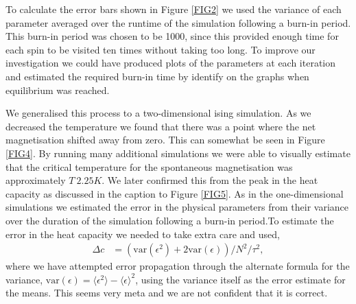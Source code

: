 \documentclass[a4paper]{article}
\begin{document}
\begin{multicols}{2}
        To calculate the error bars shown in Figure \ref{FIG2} we used the %
        variance of each parameter averaged over the runtime of the simulation %
        following a burn-in period. This burn-in period was chosen to be 1000, %
        since this provided enough time for each spin to be visited ten times %
        without taking too long. To improve our investigation we could have %
        produced plots of the parameters at each iteration and estimated the %
        required burn-in time by identify on the graphs when equilibrium was %
        reached. 
    
        We generalised this process to a two-dimensional ising simulation. %
        As we decreased the temperature we found that there was a point %
        where the net magnetisation shifted away from zero. This can somewhat %
        be seen in Figure \ref{FIG4}. By running many additional simulations %
        we were able to visually estimate that the critical temperature for %
        the spontaneous magnetisation was approximately \(T ~ 2.25K\). We %
        later confirmed this from the peak in the heat capacity as discussed %
        in the caption to Figure \ref{FIG5}. As in the one-dimensional %
        simulations we estimated the error in the physical parameters from %
        their variance over the duration of the simulation following a %
        burn-in period.To estimate the error in the heat capacity we needed %
        to take extra care and used,
        \begin{align}
            \Delta c &= \left(\text{var}(\epsilon^{2}) + 
                2\text{var}(\epsilon)\right) / N^{2} / \tau^{2},
        \end{align}
        where we have attempted error propagation through the alternate %
        formula for the variance, \(\text{var}(\epsilon) = 
        \langle\epsilon^{2}\rangle - \langle\epsilon\rangle^{2}\), using %
        the variance itself as the error estimate for the means. This seems %
        very meta and we are not confident that it is correct.
    \end{multicols}
\end{document}
